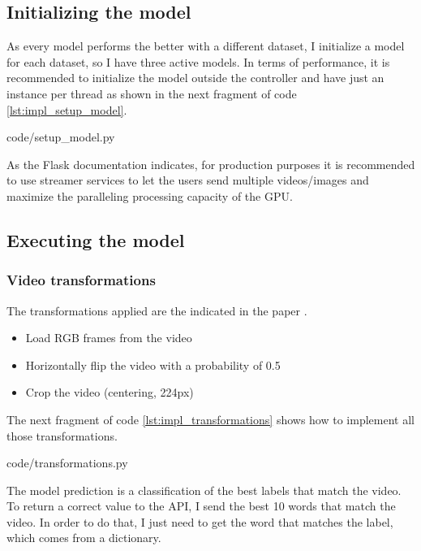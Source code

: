     \subsection{Initializing the model}
        As every model performs the better with a different dataset, I initialize a model for each dataset, so I have three active models. 
        In terms of performance, it is recommended to initialize the model outside the controller and have just an instance per thread as 
        shown in the next fragment of code \ref{lst:impl_setup_model}.

        
        {code/setup_model.py}

        As the Flask documentation indicates, for production purposes it is recommended to use streamer services \cite{ServiceStreamer} to let
        the users send multiple videos/images and maximize the paralleling processing capacity of the GPU.

    \subsection{Executing the model}
        \subsubsection{Video transformations}
            The transformations applied are the indicated in the paper \cite{Li2019}. 
            \begin{itemize}[noitemsep]
                \item Load RGB frames from the video 
                \item Horizontally flip the video with a probability of 0.5
                \item Crop the video (centering, 224px)
            \end{itemize}
            
            The next fragment of code \ref{lst:impl_transformations} shows how to implement all those transformations.
            
            {code/transformations.py}

            The model prediction is a classification of the best labels that match the video. To return a correct value to the API, I send the
            best 10 words that match the video. In order to do that, I just need to get the word that matches the label, which comes from a dictionary.
   
